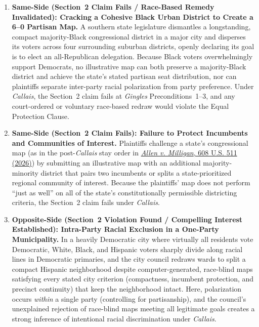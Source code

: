\documentclass[12pt]{article}
\begin{document}
\begin{enumerate}
    \item \textbf{Same-Side (Section~2 Claim Fails / Race-Based Remedy Invalidated): Cracking a Cohesive Black Urban District to Create a 6--0 Partisan Map.} A southern state legislature dismantles a longstanding, compact majority-Black congressional district in a major city and disperses its voters across four surrounding suburban districts, openly declaring its goal is to elect an all-Republican delegation. Because Black voters overwhelmingly support Democrats, no illustrative map can both preserve a majority-Black district and achieve the state's stated partisan seat distribution, nor can plaintiffs separate inter-party racial polarization from party preference. Under \textit{Callais}, the Section~2 claim fails at \textit{Gingles} Preconditions~1--3, and any court-ordered or voluntary race-based redraw would violate the Equal Protection Clause.

    \item \textbf{Same-Side (Section~2 Claim Fails): Failure to Protect Incumbents and Communities of Interest.} Plaintiffs challenge a state's congressional map (as in the post-\textit{Callais} stay order in \href{https://www.supremecourt.gov/opinions/25pdf/608us2r42_q8l1.pdf}{\textit{Allen v. Milligan}, 608 U.S. 511 (2026)}) by submitting an illustrative map with an additional majority-minority district that pairs two incumbents or splits a state-prioritized regional community of interest. Because the plaintiffs' map does not perform ``just as well'' on all of the state's constitutionally permissible districting criteria, the Section~2 claim fails under \textit{Callais}.

    \item \textbf{Opposite-Side (Section~2 Violation Found / Compelling Interest Established): Intra-Party Racial Exclusion in a One-Party Municipality.} In a heavily Democratic city where virtually all residents vote Democratic, White, Black, and Hispanic voters sharply divide along racial lines in Democratic primaries, and the city council redraws wards to split a compact Hispanic neighborhood despite computer-generated, race-blind maps satisfying every stated city criterion (compactness, incumbent protection, and precinct continuity) that keep the neighborhood intact. Here, polarization occurs \textit{within} a single party (controlling for partisanship), and the council's unexplained rejection of race-blind maps meeting all legitimate goals creates a strong inference of intentional racial discrimination under \textit{Callais}.


\end{enumerate}
\end{document}
